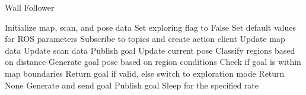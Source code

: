 \documentclass{article}
\begin{document}
\begin{algorithm}
\caption{Wall Follower}
\begin{algorithmic}[1]
        \State Initialize map, scan, and pose data
        \State Set exploring flag to False
        \State Set default values for ROS parameters
        \State Subscribe to topics and create action client
    \EndProcedure
        \State Update map data
    \EndProcedure
        \State Update scan data
            \State Publish goal
        \EndIf
    \EndProcedure
        \State Update current pose
    \EndProcedure
            \State Classify regions based on distance
            \State Generate goal pose based on region conditions
            \State Check if goal is within map boundaries
            \State Return goal if valid, else switch to exploration mode
        \Else
            \State Return None
        \EndIf
    \EndProcedure
            \State Generate and send goal
        \EndIf
    \EndProcedure
                \State Publish goal
            \EndIf
            \State Sleep for the specified rate
        \EndWhile
    \EndProcedure
\end{algorithmic}
\end{algorithm}
\end{document}
